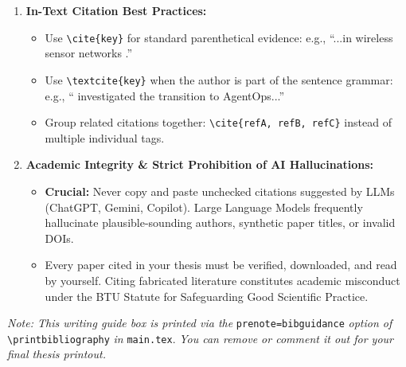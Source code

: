 {\begin{tcolorbox}
\begin{enumerate}[leftmargin=*,itemsep=2pt,topsep=2pt]
\begin{itemize}[leftmargin=*,itemsep=1pt]
        \item \textbf{Include DOIs and Volumes:} Provide complete bibliographic metadata including journal/proceedings name, volume, issue, page range, and persistent digital object identifiers (\texttt{doi = \{...\}}).
    \end{itemize}
    \item \textbf{In-Text Citation Best Practices:}
    \begin{itemize}[leftmargin=*,itemsep=1pt]
        \item Use \texttt{\textbackslash cite\{key\}} for standard parenthetical evidence: e.g., ``...in wireless sensor networks \cite{akyildiz2002wireless}.''
        \item Use \texttt{\textbackslash textcite\{key\}} when the author is part of the sentence grammar: e.g., ``\textcite{meissner2026human} investigated the transition to AgentOps...''
        \item Group related citations together: \texttt{\textbackslash cite\{refA, refB, refC\}} instead of multiple individual tags.
    \end{itemize}
    \item \textbf{Academic Integrity \& Strict Prohibition of AI Hallucinations:}
    \begin{itemize}[leftmargin=*,itemsep=1pt]
        \item \textbf{Crucial:} Never copy and paste unchecked citations suggested by LLMs (ChatGPT, Gemini, Copilot). Large Language Models frequently hallucinate plausible-sounding authors, synthetic paper titles, or invalid DOIs.
        \item Every paper cited in your thesis must be verified, downloaded, and read by yourself. Citing fabricated literature constitutes academic misconduct under the BTU Statute for Safeguarding Good Scientific Practice.
    \end{itemize}
\end{enumerate}
\textit{Note: This writing guide box is printed via the} \texttt{prenote=bibguidance} \textit{option of} \texttt{\textbackslash printbibliography} \textit{in} \texttt{main.tex}. \textit{You can remove or comment it out for your final thesis printout.}
\end{tcolorbox}
\vspace{0.6cm}
}
